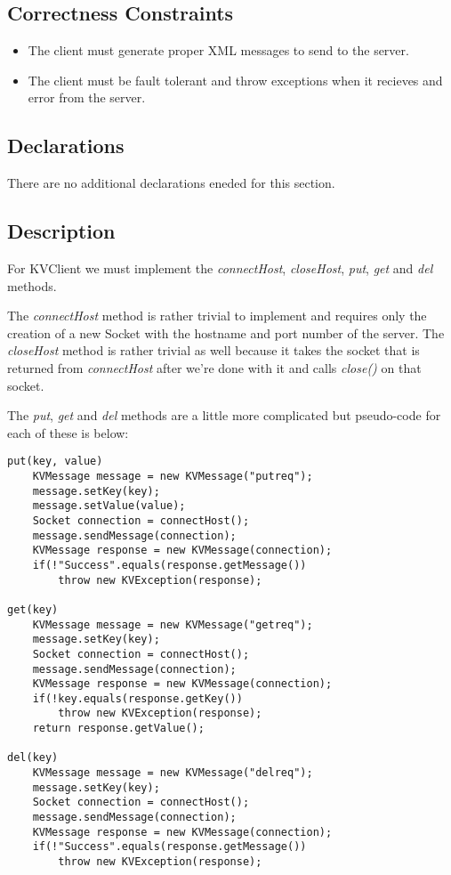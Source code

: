 \documentclass{article}
\begin{document}
\subsection*{Correctness Constraints}
\begin{itemize}
\item The client must generate proper XML messages to send to the server.
\item The client must be fault tolerant and throw exceptions when it recieves and error from the server.
\end{itemize}

\subsection*{Declarations}
There are no additional declarations eneded for this section.

\subsection*{Description}
For KVClient we must implement the \textit{connectHost}, \textit{closeHost}, \textit{put}, \textit{get} and \textit{del}
methods.

The \textit{connectHost} method is rather trivial to implement and requires only the creation of a new Socket with the
hostname and port number of the server. The \textit{closeHost} method is rather trivial as well because it takes the
socket that is returned from \textit{connectHost} after we're done with it and calls \textit{close()} on that socket.

The \textit{put}, \textit{get} and \textit{del} methods are a little more complicated but pseudo-code for each of these
is below:
\begin{verbatim}
put(key, value)
    KVMessage message = new KVMessage("putreq");
    message.setKey(key);
    message.setValue(value);
    Socket connection = connectHost();
    message.sendMessage(connection);
    KVMessage response = new KVMessage(connection);
    if(!"Success".equals(response.getMessage())
        throw new KVException(response);

get(key)
    KVMessage message = new KVMessage("getreq");
    message.setKey(key);
    Socket connection = connectHost();
    message.sendMessage(connection);
    KVMessage response = new KVMessage(connection);
    if(!key.equals(response.getKey())
        throw new KVException(response);
    return response.getValue();

del(key)
    KVMessage message = new KVMessage("delreq");
    message.setKey(key);
    Socket connection = connectHost();
    message.sendMessage(connection);
    KVMessage response = new KVMessage(connection);
    if(!"Success".equals(response.getMessage())
        throw new KVException(response);
\end{verbatim}
\end{document}
